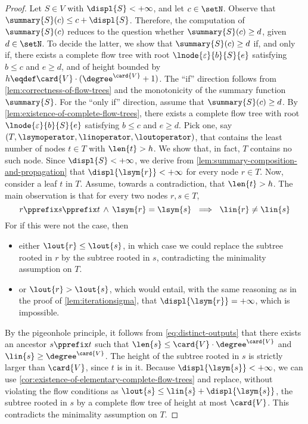 \computablesummaryfinitedispl*
\begin{proof}
  Let $S\in V$ with $\displ{S}<+\infty$,
  and let $c \in \setN$.
  Observe that $\summary{S}(c) \leq c + \displ{S}$.
  Therefore,
  the computation of $\summary{S}(c)$ reduces to the
  question whether $\summary{S}(c) \geq d$,
  given $d \in \setN$.
  To decide the latter,
  we show that $\summary{S}(c) \geq d$ if, and only if,
  there exists a complete flow tree with root
  $\lnode{\varepsilon}{b}{S}{e}$ satisfying $b \leq c$ and $e \geq d$,
  and of height bounded by $h \eqdef \card{V} \cdot (\degree^{\card{V}} + 1)$.
  The ``if'' direction follows from \cref{lem:correctness-of-flow-trees}
  and the monotonicity of the summary function $\summary{S}$.
  For the ``only if'' direction,
  assume that $\summary{S}(c) \geq d$.
  By \cref{lem:existence-of-complete-flow-trees},
  there exists a complete flow tree with
  root $\lnode{\varepsilon}{b}{S}{e}$ satisfying $b \leq c$ and $e \geq d$.
  Pick one,
  say $(T, \lsymoperator, \linoperator, \loutoperator)$,
  that contains the least number of nodes $t \in T$ with $\len{t} > h$.
  We show that, in fact, $T$ contains no such node.
  Since $\displ{S}<+\infty$,
  we derive from \cref{lem:summary-composition-and-propagation} that
  $\displ{\lsym{r}} < +\infty$ for every node $r \in T$.
  Now,
  consider a leaf $t$ in $T$.
  Assume, towards a contradiction, that $\len{t} > h$.
  The main observation is that for every two nodes $r, s \in T$,
\begin{equation}
    \label{eq:distinct-outputs}
    r \pprefix s \pprefix t \,\wedge\, \lsym{r} = \lsym{s}
    \ \implies \
    \lin{r} \neq \lin{s}
  \end{equation}
For if this were not the case,
  then
  \begin{itemize}
  \item
    either $\lout{r} \leq \lout{s}$,
    in which case we could replace the subtree rooted in $r$
    by the subtree rooted in $s$,
    contradicting the minimality assumption on $T$.
  \item
    or  $\lout{r} > \lout{s}$,
    which would entail,
    with the same reasoning as in the proof of \cref{lem:iterationsigma},
    that $\displ{\lsym{r}} = +\infty$,
    which is impossible.
  \end{itemize}
By the pigeonhole principle,
  it follows from \cref{eq:distinct-outputs} that
  there exists an ancestor $s \pprefix t$
  such that $\len{s} \leq \card{V} \cdot \degree^{\card{V}}$ and
  $\lin{s} \geq \degree^{\card{V}}$.
  The height of the subtree rooted in $s$ is strictly larger than $\card{V}$,
  since $t$ is in it.
  Because $\displ{\lsym{s}} < +\infty$,
  we can use \cref{cor:existence-of-elementary-complete-flow-trees}
  and replace,
  without violating the flow conditions as $\lout{s} \leq \lin{s} + \displ{\lsym{s}}$,
  the subtree rooted in $s$ by a complete flow tree of
  height at most $\card{V}$.
  This contradicts the minimality assumption on $T$.


\end{proof}
